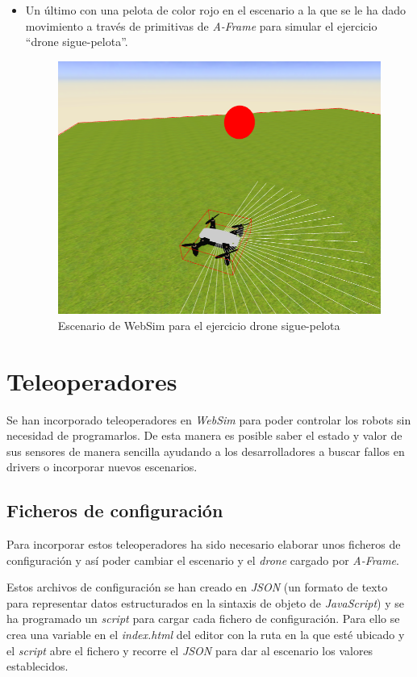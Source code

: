 \begin{itemize}
    \item Un último con una pelota de color rojo en el escenario a la que se le ha dado movimiento a través de primitivas de \textit{A-Frame} para simular el ejercicio ``drone sigue-pelota''.
    \begin{figure}[H]
    \centering
    \includegraphics[scale=0.4]{img/droneBall.png}
    \caption{Escenario de WebSim para el ejercicio drone sigue-pelota} \label{fig:droneBall}
    \end{figure}
\end{itemize} 

\section{Teleoperadores}
Se han incorporado teleoperadores en \textit{WebSim} para poder controlar los robots sin necesidad de programarlos. De esta manera es posible saber el estado y valor de sus sensores de manera sencilla ayudando a los desarrolladores a buscar fallos en drivers o incorporar nuevos escenarios. 

\subsection{Ficheros de configuración}

Para incorporar estos teleoperadores ha sido necesario elaborar unos ficheros de configuración y así poder cambiar el escenario y el \textit{drone} cargado por \textit{A-Frame}. 

Estos archivos de configuración se han creado en \textit{JSON} (un formato de texto para representar datos estructurados en la sintaxis de objeto de \textit{JavaScript}) y se ha programado un \textit{script} para cargar cada fichero de configuración. Para ello se crea una variable en el \textit{index.html} del editor con la ruta en la que esté ubicado y el \textit{script} abre el fichero y recorre el \textit{JSON} para dar al escenario los valores establecidos. \newline

